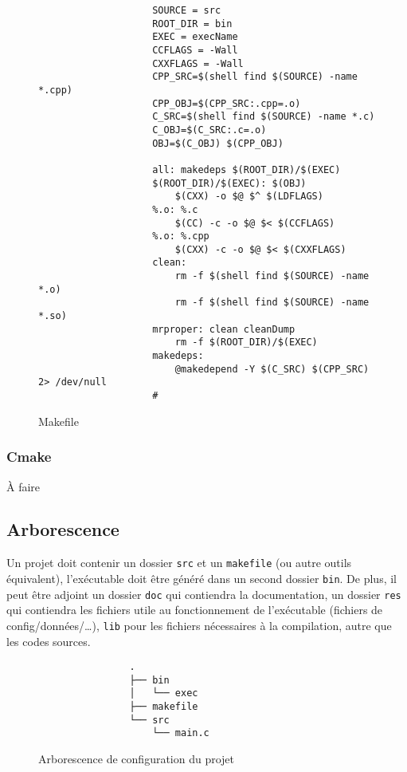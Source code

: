 			\begin{figure}[H]
				\begin{changemargin}{-2.5cm}{-2.5cm}
				\begin{tcolorbox}
				\begin{verbatim}
					SOURCE = src
					ROOT_DIR = bin
					EXEC = execName
					CCFLAGS = -Wall
					CXXFLAGS = -Wall
					CPP_SRC=$(shell find $(SOURCE) -name *.cpp)
					CPP_OBJ=$(CPP_SRC:.cpp=.o)
					C_SRC=$(shell find $(SOURCE) -name *.c)
					C_OBJ=$(C_SRC:.c=.o)
					OBJ=$(C_OBJ) $(CPP_OBJ)

					all: makedeps $(ROOT_DIR)/$(EXEC)
					$(ROOT_DIR)/$(EXEC): $(OBJ)
					    $(CXX) -o $@ $^ $(LDFLAGS)
					%.o: %.c
					    $(CC) -c -o $@ $< $(CCFLAGS)
					%.o: %.cpp
					    $(CXX) -c -o $@ $< $(CXXFLAGS)
					clean:
					    rm -f $(shell find $(SOURCE) -name *.o)
					    rm -f $(shell find $(SOURCE) -name *.so)
					mrproper: clean cleanDump
					    rm -f $(ROOT_DIR)/$(EXEC)
					makedeps:
					    @makedepend -Y $(C_SRC) $(CPP_SRC) 2> /dev/null
				    #
				\end{verbatim}
				\end{tcolorbox}
				\end{changemargin}
				\caption{Makefile}
			\end{figure}

		\subsubsection{Cmake}
			À faire

	\subsection{Arborescence}
		Un projet doit contenir un dossier \verb+src+ et un \verb+makefile+ (ou autre outils équivalent), l'exécutable doit être généré dans un second dossier \verb+bin+. De plus, il peut être adjoint un dossier \verb+doc+ qui contiendra la documentation, un dossier \verb+res+ qui contiendra les fichiers utile au fonctionnement de l’exécutable (fichiers de config/données/\dots), \verb+lib+ pour les fichiers nécessaires à la compilation, autre que les codes sources.

		\begin{figure}[H]
			\begin{changemargin}{-2.5cm}{-2.5cm}
			\begin{tcolorbox}
			\begin{verbatim}
				.
				├── bin
				│   └── exec
				├── makefile
				└── src
				    └── main.c
			\end{verbatim}
			\end{tcolorbox}
			\end{changemargin}
			\caption{Arborescence de configuration du projet}
		\end{figure}

